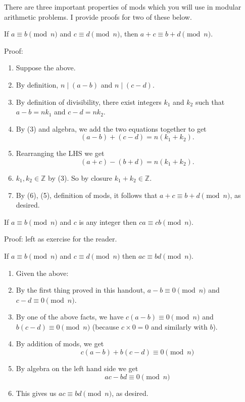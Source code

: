 There are three important properties of mods which you will use in modular arithmetic problems. I provide proofs for two of these below.

\begin{tcolorbox}
    If $a \equiv b \pmod{n}$ and $c \equiv d \pmod{n}$, then $a + c \equiv b + d \pmod{n}$.
    \begin{tcolorbox}
        Proof:
        \begin{enumerate}
            \item Suppose the above.
            \item By definition, $n \mid (a-b)$ and $n \mid (c-d)$.
            \item By definition of divisibility, there exist integers $k_1$ and $k_2$ such that $a - b = nk_1$ and $c - d = nk_2$.
            \item By (3) and algebra, we add the two equations together to get 
            \[(a - b) + (c - d) = n(k_1 + k_2).\]
            \item Rearranging the LHS we get
            \[(a + c) - (b + d) = n(k_1 + k_2).\]
            \item $k_1, k_2 \in \mathbb{Z}$ by (3). So by closure $k_1 + k_2 \in \mathbb{Z}$.
            \item By (6), (5), definition of mods, it follows that $a + c \equiv b + d \pmod{n}$, as desired.
        \end{enumerate}
    \end{tcolorbox}
\end{tcolorbox}

\begin{tcolorbox}
 If $a \equiv b \pmod{n}$ and $c$ is any integer then $ca \equiv cb \pmod{n}$.
 \begin{tcolorbox}
  Proof: left as exercise for the reader.
 \end{tcolorbox}
\end{tcolorbox}

\begin{tcolorbox}
 If $a \equiv b \pmod{n}$ and $c \equiv d \pmod{n}$ then $ac \equiv bd \pmod{n}$.
 \begin{tcolorbox}
  \begin{enumerate}
      \item Given the above:
      \item By the first thing proved in this handout, $a - b \equiv 0 \pmod{n}$ and $c - d \equiv 0 \pmod{n}$.
      \item By one of the above facts, we have $c(a - b) \equiv 0 \pmod{n}$ and $b(c-d) \equiv 0 \pmod{n}$ (because $c \times 0 = 0$ and similarly with $b$).
      \item By addition of mods, we get
      \[c(a-b) + b(c-d) \equiv 0 \pmod{n}\]
      \item By algebra on the left hand side we get
      \[ac - bd \equiv 0 \pmod{n}\]
      \item This gives us $ac \equiv bd \pmod{n}$, as desired.
      
  \end{enumerate}
 \end{tcolorbox}
\end{tcolorbox}

